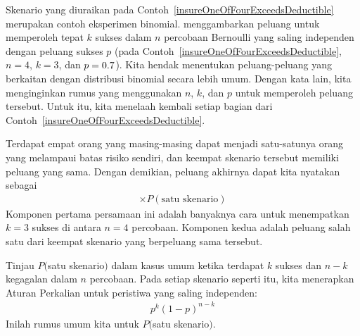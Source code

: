Skenario yang diuraikan pada
Contoh~\ref{insureOneOfFourExceedsDeductible} merupakan contoh
eksperimen binomial. 
menggambarkan peluang untuk memperoleh tepat $k$ sukses dalam $n$
percobaan Bernoulli yang saling independen dengan peluang sukses $p$
(pada Contoh~\ref{insureOneOfFourExceedsDeductible},
$n=4$, $k=3$, dan $p=0.7{}$).
Kita hendak menentukan peluang-peluang yang berkaitan dengan distribusi
binomial secara lebih umum. Dengan kata lain, kita menginginkan rumus
yang menggunakan $n$, $k$, dan $p$ untuk memperoleh peluang tersebut.
Untuk itu, kita menelaah kembali setiap bagian dari
Contoh~\ref{insureOneOfFourExceedsDeductible}.

Terdapat empat orang yang masing-masing dapat menjadi satu-satunya orang
yang melampaui batas risiko sendiri, dan keempat skenario tersebut
memiliki peluang yang sama. Dengan demikian, peluang akhirnya dapat kita
nyatakan sebagai
\begin{align*}
[\text{\# skenario}] \times P(\text{satu skenario})
\end{align*}
Komponen pertama persamaan ini adalah banyaknya cara untuk menempatkan
$k=3$ sukses di antara $n=4$ percobaan. Komponen kedua adalah peluang
salah satu dari keempat skenario yang berpeluang sama tersebut.

\D{\newpage}

Tinjau $P($satu skenario$)$ dalam kasus umum ketika terdapat $k$ sukses
dan $n-k$ kegagalan dalam $n$ percobaan. Pada setiap skenario seperti itu,
kita menerapkan Aturan Perkalian untuk peristiwa yang saling independen:
\begin{align*}
p^k (1 - p)^{n - k}
\end{align*}
Inilah rumus umum kita untuk $P($satu skenario$)$.

